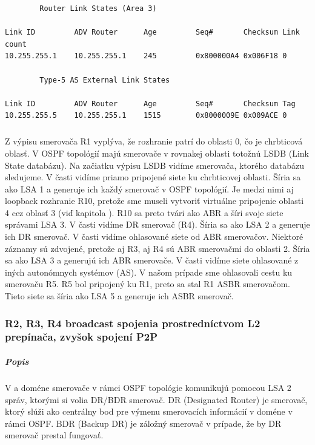 \documentclass[12pt,twoside,a4paper]{article}
\begin{document}
{\begin{small}
\begin{verbatim}
		Router Link States (Area 3)

Link ID         ADV Router      Age         Seq#       Checksum Link count
10.255.255.1    10.255.255.1    245         0x800000A4 0x006F18 0

		Type-5 AS External Link States

Link ID         ADV Router      Age         Seq#       Checksum Tag
10.255.255.5    10.255.255.1    1515        0x8000009E 0x009ACE 0

\end{verbatim}
\end{small}
}

\subparagraph{}
Z výpisu  smerovača R1 vyplýva, že rozhranie  patrí do oblasti 0, čo je chrbticová oblasť. V OSPF topológií majú smerovače v rovnakej oblasti totožnú LSDB (Link State databázu). Na začiatku výpisu LSDB vidíme  smerovača, ktorého databázu sledujeme. V časti  vidíme priamo pripojené siete ku chrbticovej oblasti. Šíria sa ako LSA 1 a generuje ich každý smerovač v OSPF topológií. Je medzi nimi aj loopback rozhranie R10, pretože sme museli vytvoriť virtuálne pripojenie oblasti 4 cez oblasť 3 (viď kapitola ). R10 sa preto tvári ako ABR a šíri svoje siete správami LSA 3. V časti  vidíme DR smerovač (R4). Šíria sa ako LSA 2 a generuje ich DR smerovač. V časti  vidíme ohlasované siete od ABR smerovačov. Niektoré záznamy sú zdvojené, pretože aj R3, aj R4 sú ABR smerovačmi do oblasti 2. Šíria sa ako LSA 3 a generujú ich ABR smerovače. V časti  vidíme siete ohlasované z iných autonómnych systémov (AS). V našom prípade sme ohlasovali cestu ku smerovaču R5. R5 bol pripojený ku R1, preto sa stal R1 ASBR smerovačom. Tieto siete sa šíria ako LSA 5 a generuje ich ASBR smerovač.



\subsubsection*{R2, R3, R4 broadcast spojenia prostredníctvom L2 prepínača, zvyšok spojení P2P}
\subparagraph{Popis}
\subparagraph{}
V  a  doméne smerovače v rámci OSPF topológie komunikujú pomocou LSA 2 správ, ktorými si volia DR/BDR smerovač. DR (Designated Router) je smerovač, ktorý slúži ako centrálny bod pre výmenu smerovacích informácií v  doméne v rámci OSPF. BDR (Backup DR) je záložný smerovač v prípade, že by DR smerovač prestal fungovať.
\end{document}
